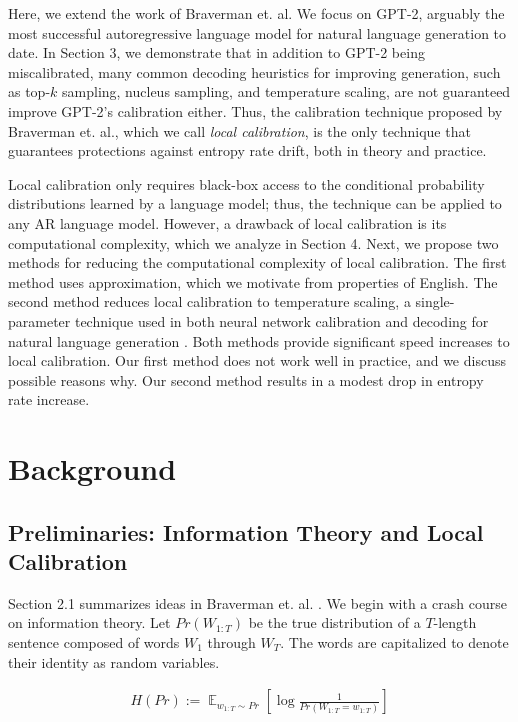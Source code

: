 \documentclass[pageno]{jpaper}
\DeclareMathOperator*{\E}{\mathbb{E}}
\begin{document}
Here, we extend the work of Braverman et. al. We focus on GPT-2, arguably the most successful autoregressive language model for natural language generation to date. In Section 3, we demonstrate that in addition to GPT-2 being miscalibrated, many common decoding heuristics for improving generation, such as top-$k$ sampling, nucleus sampling, and temperature scaling, are not guaranteed  improve GPT-2's calibration either. Thus, the calibration technique proposed by Braverman et. al., which we call \textit{local calibration}, is the only technique that guarantees protections against entropy rate drift, both in theory and practice.

Local calibration only requires black-box access to the conditional probability distributions learned by a language model; thus, the technique can be applied to any AR language model. However, a drawback of local calibration is its computational complexity, which we analyze in Section 4. Next, we propose two methods for reducing the computational complexity of local calibration. The first method uses approximation, which we motivate from properties of English. The second method reduces local calibration to temperature scaling, a single-parameter technique used in both neural network calibration and decoding for natural language generation \cite{temperature,guoTempCalibration}. Both methods provide significant speed increases to local calibration. Our first method does not work well in practice, and we discuss possible reasons why. Our second method results in a modest drop in entropy rate increase.

\section{Background}

\subsection{Preliminaries: Information Theory and Local Calibration}

Section 2.1 summarizes ideas in Braverman et. al. \cite{Braverman}. We begin with a crash course on information theory. Let $Pr(W_{1:T})$ be the true distribution of a $T$-length sentence composed of words $W_1$ through $W_T$. The words are capitalized to denote their identity as random variables. 

\begin{align*}
    H(Pr) := \E_{w_{1:T} \sim Pr} \left[\log \frac{1}{Pr(W_{1:T} = w_{1:T})}\right]
\end{align*}
\end{document}
